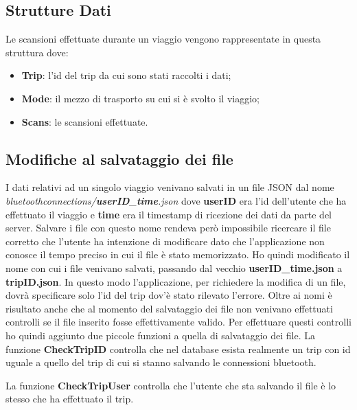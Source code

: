 \documentclass[main.tex]{subfiles}
\begin{document}
\subsection{Strutture Dati}
Le scansioni effettuate durante un viaggio vengono rappresentate in questa struttura dove:
\begin{itemize}
    \item \textbf{Trip}: l'id del trip da cui sono stati raccolti i dati;
    \item \textbf{Mode}: il mezzo di trasporto su cui si è svolto il viaggio;
    \item \textbf{Scans}: le scansioni effettuate.
\end{itemize}



\subsection{Modifiche al salvataggio dei file}

I dati relativi ad un singolo viaggio venivano salvati in un file JSON dal nome \emph{bluetoothconnections/\textbf{userID}\_\textbf{time}.json} dove \textbf{userID} era l'id dell'utente che ha effettuato il viaggio e \textbf{time} era il timestamp di ricezione dei dati da parte del server.
Salvare i file con questo nome rendeva però impossibile ricercare il file corretto che l'utente ha intenzione di modificare dato che l'applicazione non conosce il tempo preciso in cui il file è stato memorizzato. Ho quindi modificato il nome con cui i file venivano salvati, passando dal vecchio \textbf{userID\_time.json} a \textbf{tripID.json}. In questo modo l'applicazione, per richiedere la modifica di un file, dovrà specificare solo l'id del trip dov'è stato rilevato l'errore. \newline
Oltre ai nomi è risultato anche che al momento del salvataggio dei file non venivano effettuati controlli se il file inserito fosse effettivamente valido. Per effettuare questi controlli ho quindi aggiunto due piccole funzioni a quella di salvataggio dei file.\newline
La funzione \textbf{CheckTripID} controlla che nel database esista realmente un trip con id uguale a quello del trip di cui si stanno salvando le connessioni bluetooth.


La funzione \textbf{CheckTripUser} controlla che l'utente che sta salvando il file è lo stesso che ha effettuato il trip. \label{CheckTripUser}

\end{document}
